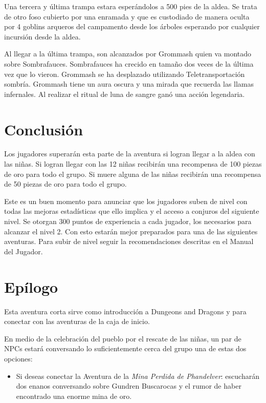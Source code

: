 \documentclass[10pt,twoside,twocolumn,openany]{dndbook}
\begin{document}
Una tercera y última trampa estara esperándolos a 500 pies de la aldea. Se trata de otro foso cubierto
por una enramada y que es custodiado de manera oculta por 4 goblins arqueros del campamento desde los 
árboles esperando por cualquier incursión desde la aldea. 

Al llegar a la última trampa, son alcanzados por Grommash quien va montado sobre Sombrafauces.
Sombrafauces ha crecido en tamaño dos veces de la última vez que lo vieron. Grommash se ha desplazado
utilizando Teletransportación sombría. Grommash tiene un aura oscura y una mirada que recuerda las llamas 
infernales. Al realizar el ritual de luna de sangre ganó una acción legendaria.

\section{Conclusión}

Los jugadores superarán esta parte de la aventura si logran llegar a la aldea con las niñas. Si 
logran llegar con las 12 niñas recibirán una recompensa de 100 piezas de oro para todo el grupo. Si
muere alguna de las niñas recibirán una recompensa de 50 piezas de oro para todo el grupo.

Este es un buen momento para anunciar que los jugadores suben de nivel con todas las mejoras 
estadísticas que ello implica y el acceso a conjuros del siguiente nivel. Se otorgan 300 puntos 
de experiencia a cada jugador, los necesarios para alcanzar el nivel 2. Con esto estarán mejor 
preparados para una de las siguientes aventuras. Para subir de nivel seguir la recomendaciones
descritas en el Manual del Jugador.

\section{Epílogo}

Esta aventura corta sirve como introducción a Dungeons and Dragons y para conectar con las 
aventuras de la caja de inicio.

En medio de la celebración del pueblo por el rescate de las niñas, un par de NPCs estará conversando
lo suficientemente cerca del grupo una de estas dos opciones:

\begin{itemize}
  \item Si deseas conectar la Aventura de la \emph{Mina Perdida de Phandelver}: escucharán dos 
  enanos conversando sobre Gundren Buscarocas y el rumor de haber encontrado una enorme mina de 
  oro.
\end{itemize}
\end{document}

